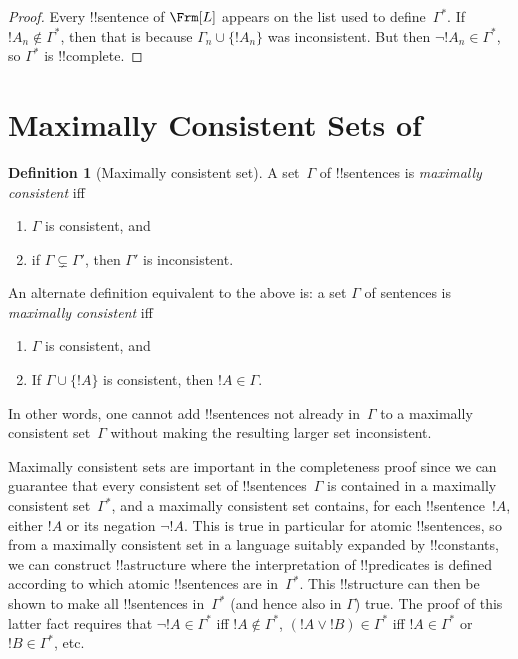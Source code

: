\documentclass[10pt,a4paper]{article}
\theoremstyle{plain}
\theoremstyle{definition}
\newtheorem{defn}[thm]{Definition}
\theoremstyle{remark}
\newenvironment{explain}{}{}
\newcommand*{\olfileid}[3]{}
\newcommand*{\olsection}[1]{\section*{#1}}
\newcommand*{\ollabel}[1]{\label{#1}}
\begin{document}
\begin{proof}
Every !!{sentence} of $\Frm[L]$ appears on the list used to
define~$\Gamma^*$. If $!A_n \notin \Gamma^*$, then that is because
$\Gamma_n \cup \{!A_n\}$ was inconsistent.  But then $\lnot !A_n
\in \Gamma^*$, so $\Gamma^*$ is !!{complete}.
\end{proof}






\olfileid{fol}{com}{mcs}
\olsection{Maximally Consistent Sets of }

\begin{defn}[Maximally consistent set]
\ollabel{mcs}
A set~$\Gamma$ of !!{sentence}s is \emph{maximally consistent} iff
\begin{enumerate}
\item $\Gamma$ is consistent, and
\item if $\Gamma \subsetneq \Gamma'$, then $\Gamma'$ is inconsistent.
\end{enumerate}
\end{defn}

\begin{explain}
An alternate definition equivalent to the above is: a set $\Gamma$ of
sentences is \emph{maximally consistent} iff
\begin{enumerate}
\item $\Gamma$ is consistent, and
\item If $\Gamma \cup \{ !A \}$ is consistent, then $!A \in \Gamma$.
\end{enumerate}
In other words, one cannot add !!{sentence}s not already in~$\Gamma$
to a maximally consistent set~$\Gamma$ without making the resulting
larger set inconsistent.
\end{explain}

\begin{explain}
Maximally consistent sets are important in the completeness proof
since we can guarantee that every consistent set of !!{sentence}s~$\Gamma$
is contained in a maximally consistent set~$\Gamma^*$, and a maximally
consistent set contains, for each !!{sentence}~$!A$, either $!A$ or its
negation $\lnot !A$. This is true in particular for atomic !!{sentence}s,
so from a maximally consistent set in a language suitably expanded by
!!{constant}s, we can construct !!a{structure} where the
interpretation of !!{predicate}s is defined according to which atomic
!!{sentence}s are in~$\Gamma^*$. This !!{structure} can then be shown to
make all !!{sentence}s in~$\Gamma^*$ (and hence also in $\Gamma$)
true. The proof of this latter fact requires that $\lnot !A \in
\Gamma^*$ iff $!A \notin \Gamma^*$, $(!A \lor !B) \in \Gamma^*$ iff $!A
\in \Gamma^*$ or $!B \in \Gamma^*$, etc.
\end{explain}
\end{document}
